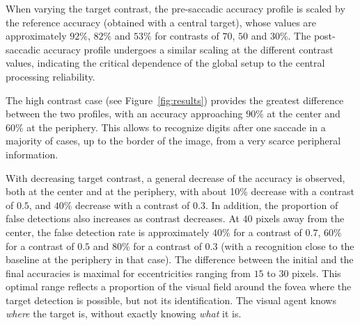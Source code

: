 When varying the target contrast, the pre-saccadic accuracy profile is scaled by the reference accuracy (obtained with a central target), whose values are approximately $92\%$, $82\%$ and $53\%$ for contrasts of $70$, $50$ and $30$\%. The post-saccadic accuracy profile undergoes a similar scaling at the different contrast values, indicating the critical dependence of the global setup to the central processing reliability.

The high contrast case (see Figure~\ref{fig:results}) provides the greatest difference between the two profiles, with an accuracy approaching $90\%$ at the center and $60\%$ at the periphery. This allows to recognize digits after one saccade in a majority of cases, up to the border of the image, from a very scarce peripheral information. 


With decreasing target contrast, a general decrease of the accuracy is observed, both at the center and at the periphery, with about 10\% decrease with a contrast of $0.5$, and $40\%$ decrease with a contrast of $0.3$. In addition, the proportion of false detections also increases as contrast decreases. At $40$ pixels away from the center, the false detection rate is approximately $40\%$ for a contrast of $0.7$, $60\%$ for a contrast of $0.5$ and $80\%$ for a contrast of $0.3$ (with a recognition close to the baseline at the periphery in that case). The difference between the initial and the final accuracies is maximal for eccentricities ranging from $15$ to $30$ pixels. This optimal range reflects a proportion of the visual field around the fovea where the target detection is possible, but not its identification. The visual agent knows \emph{where} the target is, without exactly knowing \emph{what} it is.

